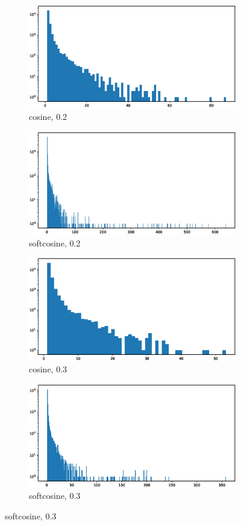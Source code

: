 \documentclass[a4paper,man,natbib,floatsintext,mask]{apa6}
\begin{document}
\begin{figure}[h!]
\captionsetup[subfigure]{justification=centering}
\begin{subfigure}{.5\textwidth}
  \centering
  \includegraphics[width=.8\linewidth]{figures/cos02.eps}  
  \caption{cosine, 0.2}
  \label{fig:sub-cos02}
\end{subfigure}
\begin{subfigure}{.5\textwidth}
  \centering
  \includegraphics[width=.8\linewidth]{figures/softcos02.eps}  
  \caption{softcosine, 0.2}
  \label{fig:sub-softcos02}
\end{subfigure}

\begin{subfigure}{.5\textwidth}
  \centering
  \includegraphics[width=.8\linewidth]{figures/cos03.eps}  
  \caption{cosine, 0.3}
  \label{fig:sub-cos03}
\end{subfigure}
\begin{subfigure}{.5\textwidth}
  \centering
  \includegraphics[width=.8\linewidth]{figures/softcos03.eps}  
  \caption{softcosine, 0.3}
  \label{fig:sub-softcos03}
\end{subfigure}


\end{figure}
\end{document}
